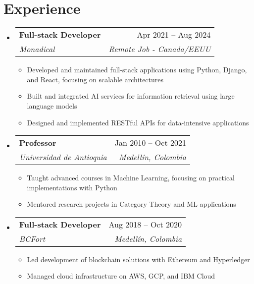 \documentclass[letterpaper,11pt]{article}
\makeatletter
\newcommand{\resumeSubheading}[4]{
  \vspace{-2pt}
  \item[]
  \begin{tabular*}{\textwidth}{@{\extracolsep{\fill}}l r}
    \textbf{#1} & #2 \\
    \textit{#3} & \textit{#4} \\
  \end{tabular*}
  \vspace{-5pt}
}
\makeatother
\begin{document}
\section{Experience}
\begin{itemize}[leftmargin=0pt, itemindent=0pt, label={}]
\resumeSubheading
{Full-stack Developer}{Apr 2021 -- Aug 2024}
{Monadical}{Remote Job - Canada/EEUU}
\begin{itemize}[leftmargin=*]
    \item Developed and maintained full-stack applications using Python, Django, and React, focusing on scalable architectures
    \item Built and integrated AI services for information retrieval using large language models
    \item Designed and implemented RESTful APIs for data-intensive applications
\end{itemize}

\resumeSubheading
{Professor}{Jan 2010 -- Oct 2021}
{Universidad de Antioquia}{Medellín, Colombia}
\begin{itemize}[leftmargin=*]
    \item Taught advanced courses in Machine Learning, focusing on practical implementations with Python
    \item Mentored research projects in Category Theory and ML applications
\end{itemize}

\resumeSubheading
{Full-stack Developer}{Aug 2018 -- Oct 2020}
{BCFort}{Medellín, Colombia}
\begin{itemize}[leftmargin=*]
    \item Led development of blockchain solutions with Ethereum and Hyperledger
    \item Managed cloud infrastructure on AWS, GCP, and IBM Cloud
\end{itemize}
\end{itemize}
\end{document}
